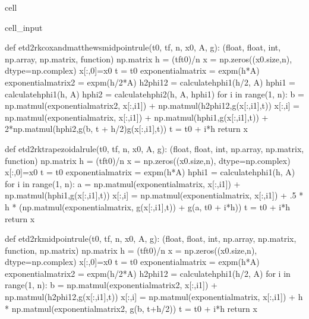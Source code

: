 \documentclass[letterpaper,10pt,english]{jupyterBook}
\begin{document}
\begin{sphinxuseclass}{cell}
\begin{sphinxVerbatimInput}
\begin{sphinxuseclass}{cell_input}
\begin{sphinxVerbatim}[commandchars=\\\{\}]
def etd2rk\PYGZus{}cox\PYGZus{}and\PYGZus{}matthews\PYGZus{}midpoint\PYGZus{}rule(t0, tf, n, x0, A, g):
    \PYGZsq{}\PYGZsq{}\PYGZsq{}(float, float, int, np.array, np.matrix, function) \PYGZhy{}\PYGZgt{} np.matrix\PYGZsq{}\PYGZsq{}\PYGZsq{}
    h = (tf\PYGZhy{}t0)/n
    x = np.zeros((x0.size,n), dtype=np.complex\PYGZus{})
    x[:,0]=x0
    t = t0
    exponential\PYGZus{}matrix = expm(\PYGZhy{}h*A)
    exponential\PYGZus{}matrix\PYGZus{}2 = expm(\PYGZhy{}h/2*A)
    h\PYGZus{}2phi1\PYGZus{}2 = calculate\PYGZus{}hphi1(h/2, A)
    hphi1 = calculate\PYGZus{}hphi1(h, A)
    hphi2 = calculate\PYGZus{}hphi2(h, A, hphi1)
    for i in range(1, n):
        b = np.matmul(exponential\PYGZus{}matrix\PYGZus{}2, x[:,i\PYGZhy{}1]) + np.matmul(h\PYGZus{}2phi1\PYGZus{}2,g(x[:,i\PYGZhy{}1],t))
        x[:,i] = np.matmul(exponential\PYGZus{}matrix, x[:,i\PYGZhy{}1]) + np.matmul(hphi1,g(x[:,i\PYGZhy{}1],t)) + 2*np.matmul(hphi2,g(b, t + h/2)\PYGZhy{}g(x[:,i\PYGZhy{}1],t))
        t = t0 + i*h
    return x

def etd2rk\PYGZus{}trapezoidal\PYGZus{}rule(t0, tf, n, x0, A, g):
    \PYGZsq{}\PYGZsq{}\PYGZsq{}(float, float, int, np.array, np.matrix, function) \PYGZhy{}\PYGZgt{} np.matrix\PYGZsq{}\PYGZsq{}\PYGZsq{}
    h = (tf\PYGZhy{}t0)/n
    x = np.zeros((x0.size,n), dtype=np.complex\PYGZus{})
    x[:,0]=x0
    t = t0
    exponential\PYGZus{}matrix = expm(\PYGZhy{}h*A)
    hphi1 = calculate\PYGZus{}hphi1(h, A)
    for i in range(1, n):
        a = np.matmul(exponential\PYGZus{}matrix, x[:,i\PYGZhy{}1]) + np.matmul(hphi1,g(x[:,i\PYGZhy{}1],t))
        x[:,i] = np.matmul(exponential\PYGZus{}matrix, x[:,i\PYGZhy{}1]) + .5 * h * (np.matmul(exponential\PYGZus{}matrix, g(x[:,i\PYGZhy{}1],t)) + g(a, t0 + i*h))
        t = t0 + i*h
    return x

def etd2rk\PYGZus{}midpoint\PYGZus{}rule(t0, tf, n, x0, A, g):
    \PYGZsq{}\PYGZsq{}\PYGZsq{}(float, float, int, np.array, np.matrix, function, np.matrix) \PYGZhy{}\PYGZgt{} np.matrix\PYGZsq{}\PYGZsq{}\PYGZsq{}
    h = (tf\PYGZhy{}t0)/n
    x = np.zeros((x0.size,n), dtype=np.complex\PYGZus{})
    x[:,0]=x0
    t = t0
    exponential\PYGZus{}matrix = expm(\PYGZhy{}h*A)
    exponential\PYGZus{}matrix\PYGZus{}2 = expm(\PYGZhy{}h/2*A)
    h\PYGZus{}2phi1\PYGZus{}2 = calculate\PYGZus{}hphi1(h/2, A)
    for i in range(1, n):
        b = np.matmul(exponential\PYGZus{}matrix\PYGZus{}2, x[:,i\PYGZhy{}1]) + np.matmul(h\PYGZus{}2phi1\PYGZus{}2,g(x[:,i\PYGZhy{}1],t))
        x[:,i] = np.matmul(exponential\PYGZus{}matrix, x[:,i\PYGZhy{}1]) + h * np.matmul(exponential\PYGZus{}matrix\PYGZus{}2, g(b, t+h/2))
        t = t0 + i*h
    return x


\end{sphinxVerbatim}
\end{sphinxuseclass}
\end{sphinxVerbatimInput}
\end{sphinxuseclass}
\end{document}
